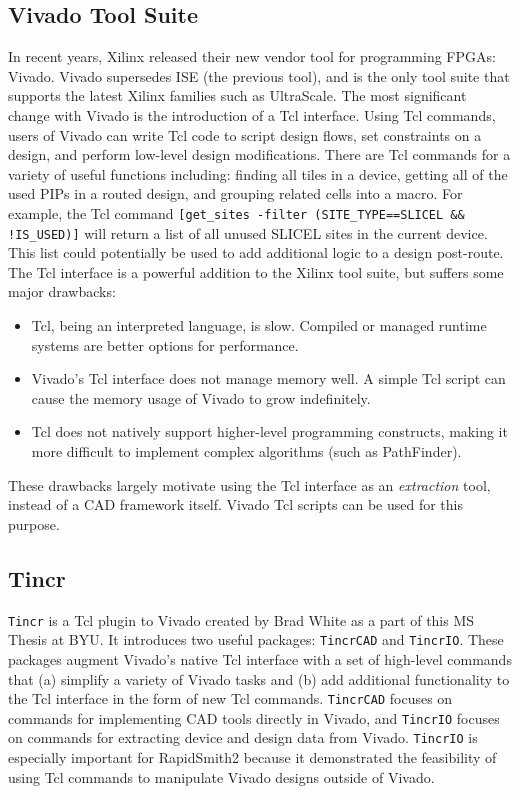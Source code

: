 \subsection{Vivado Tool Suite}
In recent years, Xilinx released their new vendor tool for programming FPGAs:
Vivado. Vivado supersedes ISE (the previous tool), and is the only tool suite
that supports the latest Xilinx families such as UltraScale. The most
significant change with Vivado is the introduction of a Tcl interface. Using
Tcl commands, users of Vivado can write Tcl code to script design flows, set
constraints on a design, and perform low-level design modifications. There are
Tcl commands for a variety of useful functions including: finding all tiles in
a device, getting all of the used PIPs in a routed design, and grouping related
cells into a macro. For example, the Tcl command \texttt{[get\_sites -filter
(SITE\_TYPE==SLICEL \&\& !IS\_USED)]} will return a list of all unused SLICEL
sites in the current device. This list could potentially be used to add
additional logic to a design post-route. The Tcl interface is a powerful
addition to the Xilinx tool suite, but suffers some major drawbacks:

\begin {itemize}
  \item Tcl, being an interpreted language, is slow. Compiled or managed runtime
  systems are better options for performance.
  \item Vivado's Tcl interface does not manage memory well. A simple Tcl script
  can cause the memory usage of Vivado to grow indefinitely.
  \item Tcl does not natively support higher-level programming constructs,
  making it more difficult to implement complex algorithms (such as
  PathFinder).
\end{itemize}

\noindent These drawbacks largely motivate using the Tcl interface as an
\textit{extraction} tool, instead of a CAD framework itself. Vivado Tcl scripts
can be used for this purpose.

\subsection{Tincr} \label{sec:tincr}
\texttt{Tincr} is a Tcl plugin to Vivado created by
Brad White as a part of this MS Thesis at BYU. It introduces two useful packages:
\texttt{TincrCAD} and \texttt{TincrIO}. These packages augment Vivado's native Tcl interface with a
set of high-level commands that (a) simplify a variety of Vivado tasks and (b)
add additional functionality to the Tcl interface in the form of new Tcl
commands. \texttt{TincrCAD} focuses on commands for implementing CAD tools
directly in Vivado, and \texttt{TincrIO} focuses on commands for extracting
device and design data from Vivado. \texttt{TincrIO} is especially important
for RapidSmith2 because it demonstrated the feasibility of using
Tcl commands to manipulate Vivado designs outside of Vivado.

